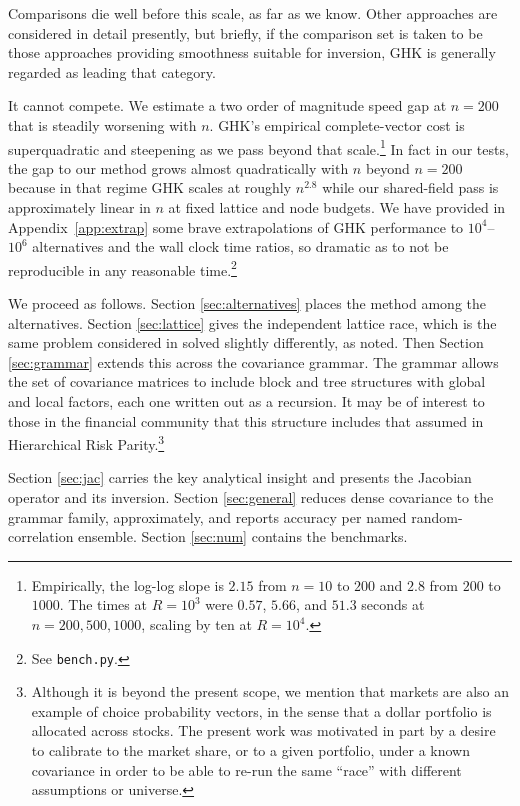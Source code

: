 \documentclass[11pt]{article}
\begin{document}
Comparisons die well before this scale, as far as we know. Other approaches are considered in detail presently, but briefly, if the comparison set is taken to be those approaches providing smoothness suitable for inversion, GHK is generally regarded as leading that category.

It cannot compete. We estimate a two order of magnitude speed gap at $n=200$ that is steadily worsening with $n$. GHK's empirical complete-vector cost is superquadratic and steepening as we pass beyond that scale.\footnote{Empirically, the log-log slope is
$2.15$ from $n=10$ to $200$ and $2.8$ from $200$ to $1000$. The times at
$R=10^{3}$ were $0.57$, $5.66$, and $51.3$ seconds at $n=200,500,1000$,
scaling by ten at $R=10^{4}$.} In fact in our tests, the gap to our method grows almost quadratically with $n$ beyond $n=200$ because in that regime GHK scales at roughly $n^{2.8}$ while our shared-field pass is approximately linear in $n$ at fixed
lattice and node budgets. We have provided in Appendix~\ref{app:extrap} some brave extrapolations of GHK performance to
$10^{4}$--$10^{6}$ alternatives and the wall clock time ratios, so dramatic as to not be reproducible in any reasonable time.\footnote{See \texttt{bench.py}.}

We proceed as follows. Section \ref{sec:alternatives} places the method among the alternatives.
Section \ref{sec:lattice} gives the independent lattice race, which is the same problem considered in \citet{cotton2021} solved slightly differently, as noted. Then Section
\ref{sec:grammar} extends this across the covariance grammar. The grammar allows the set of covariance matrices to include block and tree structures with global and local factors, each one written out as a recursion. It may be of interest to those in the financial community that this structure includes that assumed in Hierarchical Risk Parity.\footnote{Although it is beyond the present scope, we mention that markets are also an example of choice probability vectors, in the sense that a dollar portfolio is allocated across stocks. The present work was motivated in part by a desire to calibrate to the market share, or to a given portfolio, under a known covariance in order to be able to re-run the same ``race'' with different assumptions or universe.}

Section \ref{sec:jac} carries the key analytical insight and presents
the Jacobian operator and its inversion. Section \ref{sec:general} reduces
dense covariance to the grammar family, approximately, and reports accuracy
per named random-correlation ensemble. Section \ref{sec:num} contains the
benchmarks.
\end{document}
